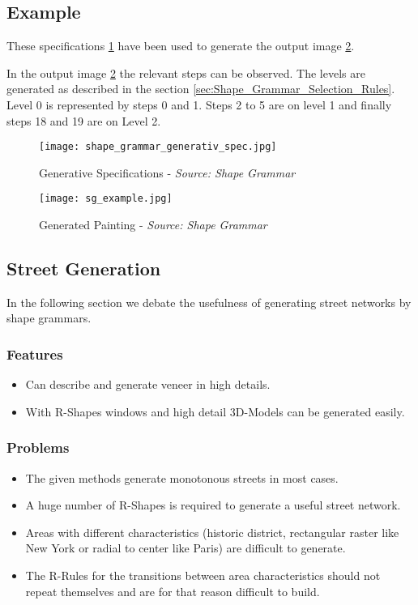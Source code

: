\subsection{Example}
These specifications \ref{fig:shape_grammar_gen_specifications} have been used to generate the output image \ref{fig:Shape Grammars/Example}.

In the output image \ref{fig:Shape Grammars/Example} the relevant steps can be observed. The levels are generated as described in the section \ref{sec:Shape_Grammar_Selection_Rules}.
\newline
Level 0 is represented by steps 0 and 1. Steps 2 to 5 are on level 1 and finally steps 18 and 19 are on Level 2.
\begin{figure}[!ht]
    \centering
    \texttt{[image: shape\_grammar\_generativ\_spec.jpg]}
    \caption{Generative Specifications - \textit{Source: Shape Grammar} \citep{shapeGrammars:1972}}
    \label{fig:shape_grammar_gen_specifications}
\end{figure}

\begin{figure}[!ht]
    \centering
    \texttt{[image: sg\_example.jpg]}
    \caption{ Generated Painting - \textit{Source: Shape Grammar} \citep{shapeGrammars:1972}}
    \label{fig:Shape Grammars/Example}
\end{figure}

\FloatBarrier
\pagebreak
\subsection{Street Generation}
In the following section we debate the usefulness of generating street networks by shape grammars.
\subsubsection{Features}
\begin{itemize}
    \item Can describe and generate veneer in high details.
    \item With R-Shapes windows and high detail 3D-Models can be generated easily.
\end{itemize}

\subsubsection{Problems}
\begin{itemize}
    \item The given methods generate monotonous streets in most cases. 
    \item A huge number of R-Shapes is required to generate a useful street network.
    \item Areas with different characteristics (historic district, rectangular raster like New York or radial to center like Paris) are difficult to generate.
    \item The R-Rules for the transitions between area characteristics should not repeat themselves and are for that reason difficult to build.
\end{itemize}

